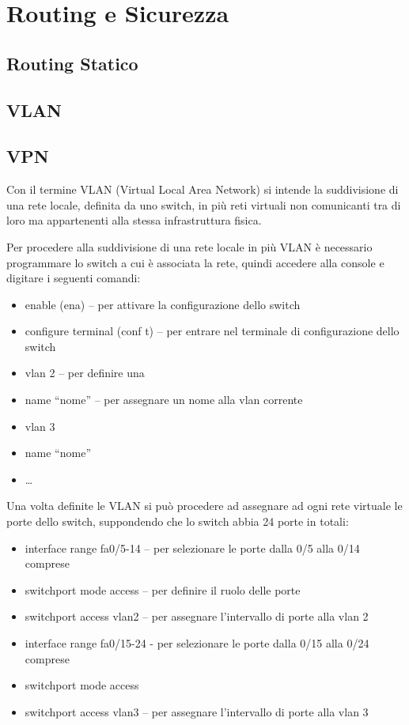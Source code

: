 \section{Routing e Sicurezza}
\subsection{Routing Statico}
\subsection{VLAN}
\subsection{VPN}
Con il termine VLAN (Virtual Local Area Network) si intende la suddivisione di una rete locale, definita da uno switch, in più reti virtuali non comunicanti tra di loro ma appartenenti alla stessa infrastruttura fisica.

Per procedere alla suddivisione di una rete locale in più VLAN è necessario programmare lo switch a cui è associata la rete, quindi accedere alla console e digitare i seguenti comandi:

\begin{itemize}
    \item enable (ena) – per attivare la configurazione dello switch 
    \item configure terminal (conf t) – per entrare nel terminale di configurazione dello switch 
    \item vlan 2 – per definire una 
    \item name “nome” – per assegnare un nome alla vlan corrente 
    \item vlan 3
    \item name “nome”
    \item …
\end{itemize}

Una volta definite le VLAN si può procedere ad assegnare ad ogni rete virtuale le porte dello switch, suppondendo che lo switch abbia 24 porte in totali:

\begin{itemize}
    \item interface range fa0/5-14 – per selezionare le porte dalla 0/5 alla 0/14 comprese
    \item switchport mode access – per definire il ruolo delle porte
    \item switchport access vlan2 – per assegnare l’intervallo di porte alla vlan 2
    \item interface range fa0/15-24 - per selezionare le porte dalla 0/15 alla 0/24 comprese
    \item switchport mode access
    \item switchport access vlan3 – per assegnare l’intervallo di porte alla vlan 3
\end{itemize}

